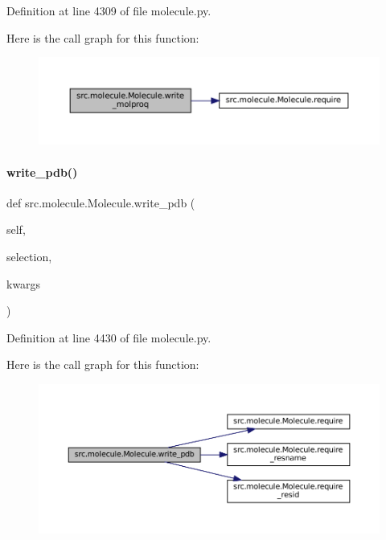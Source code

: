 Definition at line 4309 of file molecule.\+py.

Here is the call graph for this function\+:
\nopagebreak
\begin{figure}[H]
\begin{center}
\leavevmode
\includegraphics[width=350pt]{classsrc_1_1molecule_1_1Molecule_ab74230360451f0feefcfceae3b292223_cgraph}
\end{center}
\end{figure}
\mbox{\label{classsrc_1_1molecule_1_1Molecule_adea929913736e69b7af631dc0014a1e7}} 
\paragraph{\texorpdfstring{write\+\_\+pdb()}{write\_pdb()}}
{\footnotesize\ttfamily def src.\+molecule.\+Molecule.\+write\+\_\+pdb (\begin{DoxyParamCaption}\item[{}]{self,  }\item[{}]{selection,  }\item[{}]{kwargs }\end{DoxyParamCaption})}



Definition at line 4430 of file molecule.\+py.

Here is the call graph for this function\+:
\nopagebreak
\begin{figure}[H]
\begin{center}
\leavevmode
\includegraphics[width=350pt]{classsrc_1_1molecule_1_1Molecule_adea929913736e69b7af631dc0014a1e7_cgraph}
\end{center}
\end{figure}
\mbox{\label{classsrc_1_1molecule_1_1Molecule_a21d78053aab2fda1fd5e2577a02ec696}} 
